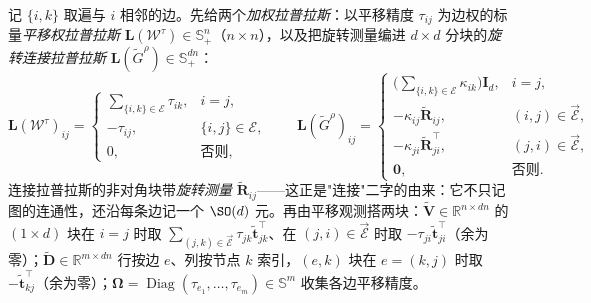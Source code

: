 \begin{derivation}
\label{der:nlopt-sesync-Q}
记 $\{i,k\}$ 取遍与 $i$ 相邻的边。先给两个\emph{加权拉普拉斯}：以平移精度 $\tau_{ij}$ 为边权的标量\emph{平移权拉普拉斯} $\mathbf{L}(\mathcal{W}^\tau)\in\mathbb{S}^n_+$（$n\times n$），以及把旋转测量编进 $d\times d$ 分块的\emph{旋转连接拉普拉斯} $\mathbf{L}(\tilde{G}^\rho)\in\mathbb{S}^{dn}_+$：
\begin{equation}
  \mathbf{L}(\mathcal{W}^\tau)_{ij}=\begin{cases}\textstyle\sum_{\{i,k\}\in\mathcal{E}}\tau_{ik},&i=j,\\-\tau_{ij},&\{i,j\}\in\mathcal{E},\\0,&\text{否则},\end{cases}
  \qquad
  \mathbf{L}(\tilde{G}^\rho)_{ij}=\begin{cases}\big(\textstyle\sum_{\{i,k\}\in\mathcal{E}}\kappa_{ik}\big)\mathbf{I}_d,&i=j,\\-\kappa_{ij}\tilde{\mathbf{R}}_{ij},&(i,j)\in\overrightarrow{\mathcal{E}},\\-\kappa_{ji}\tilde{\mathbf{R}}_{ji}^\top,&(j,i)\in\overrightarrow{\mathcal{E}},\\\mathbf{0},&\text{否则}.\end{cases}
  \label{eq:nlopt-sesync-laplacians}
\end{equation}
连接拉普拉斯的非对角块带\emph{旋转测量} $\tilde{\mathbf{R}}_{ij}$——这正是"连接"二字的由来：它不只记图的连通性，还沿每条边记一个 $\SO(d)$ 元。再由平移观测搭两块：$\tilde{\mathbf{V}}\in\mathbb{R}^{n\times dn}$ 的 $(1{\times}d)$ 块在 $i=j$ 时取 $\sum_{(j,k)\in\overrightarrow{\mathcal{E}}}\tau_{jk}\tilde{\mathbf{t}}_{jk}^\top$、在 $(j,i)\in\overrightarrow{\mathcal{E}}$ 时取 $-\tau_{ji}\tilde{\mathbf{t}}_{ji}^\top$（余为零）；$\tilde{\mathbf{D}}\in\mathbb{R}^{m\times dn}$ 行按边 $e$、列按节点 $k$ 索引，$(e,k)$ 块在 $e=(k,j)$ 时取 $-\tilde{\mathbf{t}}_{kj}^\top$（余为零）；$\boldsymbol{\Omega}=\operatorname{Diag}(\tau_{e_1},\dots,\tau_{e_m})\in\mathbb{S}^m$ 收集各边平移精度。


\end{derivation}
